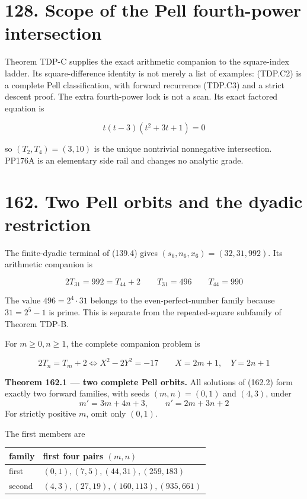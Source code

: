 \documentclass[
  11pt,
]{book}
\renewenvironment{quote}
  {\begin{tcolorbox}[
      enhanced,
      breakable,
      colback=tncream,
      colframe=tnrust,
      boxrule=0.8pt,
      arc=1.5pt,
      left=7pt,
      right=7pt,
      top=6pt,
      bottom=6pt]}
  {\end{tcolorbox}}
\begin{document}
\section{128. Scope of the Pell fourth-power
intersection}\label{scope-of-the-pell-fourth-power-intersection}

Theorem TDP-C supplies the exact arithmetic companion to the
square-index ladder. Its square-difference identity is not merely a list
of examples: (TDP.C2) is a complete Pell classification, with forward
recurrence (TDP.C3) and a strict descent proof. The extra fourth-power
lock is not a scan. Its exact factored equation is

\[
t(t-3)(t^2+3t+1)=0
\]

so \((T_2,T_4)=(3,10)\) is the unique nontrivial nonnegative
intersection. PP176A is an elementary side rail and changes no analytic
grade.

\section{162. Two Pell orbits and the dyadic
restriction}\label{two-pell-orbits-and-the-dyadic-restriction}

The finite-dyadic terminal of (139.4) gives
\((s_6,n_6,x_6)=(32,31,992)\). Its arithmetic companion is

\[
2T_{31}=992=T_{44}+2
\qquad T_{31}=496
\qquad T_{44}=990
\tag{162.1}
\]

The value \(496=2^4\cdot31\) belongs to the even-perfect-number family
because \(31=2^5-1\) is prime. This is separate from the repeated-square
subfamily of Theorem TDP-B.

For \(m\ge0,n\ge1\), the complete companion problem is

\[
2T_n=T_m+2
\iff X^2-2Y^2=-17
\qquad X=2m+1,\quad Y=2n+1
\tag{162.2}
\]


\begin{quote}
\textbf{Theorem 162.1 --- two complete Pell orbits.} All solutions of
(162.2) form exactly two forward families, with seeds \((m,n)=(0,1)\)
and \((4,3)\), under \[m'=3m+4n+3,\qquad n'=2m+3n+2\] For strictly
positive \(m\), omit only \((0,1)\).
\end{quote}

The first members are

\begin{longtable}[]{@{}ll@{}}
\toprule\noalign{}
family & first four pairs \((m,n)\) \\
\midrule\noalign{}
\endhead
\bottomrule\noalign{}
\endlastfoot
first & \((0,1),(7,5),(44,31),(259,183)\) \\
second & \((4,3),(27,19),(160,113),(935,661)\) \\
\end{longtable}
\end{document}
